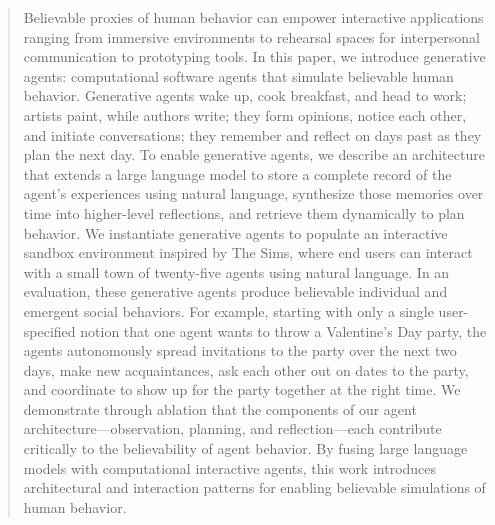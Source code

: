\title{}

\begin{abstract}
Believable proxies of human behavior can empower interactive applications ranging from immersive environments to rehearsal spaces for interpersonal communication to prototyping tools. In this paper, we introduce generative agents: computational software agents that simulate believable human behavior. Generative agents wake up, cook breakfast, and head to work; artists paint, while authors write; they form opinions, notice each other, and initiate conversations; they remember and reflect on days past as they plan the next day. To enable generative agents, we describe an architecture that extends a large language model to store a complete record of the agent's experiences using natural language, synthesize those memories over time into higher-level reflections, and retrieve them dynamically to plan behavior. We instantiate generative agents to populate an interactive sandbox environment inspired by The Sims, where end users can interact with a small town of twenty-five agents using natural language. In an evaluation, these generative agents produce believable individual and emergent social behaviors. For example, starting with only a single user-specified notion that one agent wants to throw a Valentine's Day party, the agents autonomously spread invitations to the party over the next two days, make new acquaintances, ask each other out on dates to the party, and coordinate to show up for the party together at the right time. We demonstrate through ablation that the components of our agent architecture—observation, planning, and reflection—each contribute critically to the believability of agent behavior. By fusing large language models with computational interactive agents, this work introduces architectural and interaction patterns for enabling believable simulations of human behavior.
\end{abstract}

